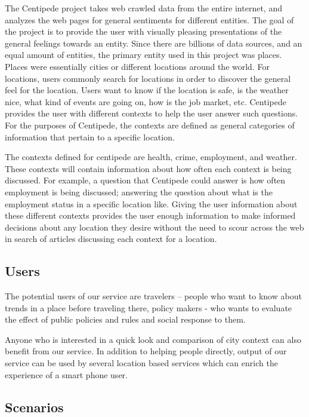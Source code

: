 \documentclass[conference]{IEEEtran}
\begin{document}
The Centipede project takes web crawled data from the entire internet, and analyzes the web pages for general sentiments for different entities. The goal of the project is to provide the user with visually pleasing presentations of the general feelings towards an entity. Since there are billions of data sources, and an equal amount of entities, the primary entity used in this project was places. Places were essentially cities or different locations around the world. For locations, users commonly search for locations in order to discover the general feel for the location. Users want to know if the location is safe, is the weather nice, what kind of events are going on, how is the job market, etc. Centipede provides the user with different contexts to help the user answer such questions. For the purposes of Centipede, the contexts are defined as general categories of information that pertain to a specific location. 

The contexts defined for centipede are health, crime, employment, and weather. These contexts will contain information about how often each context is being discussed. For example, a question that Centipede could answer is how often employment is being discussed; answering the question about what is the employment status in a specific location like. Giving the user information about these different contexts provides the user enough information to make informed decisions about any location they desire without the need to scour across the web in search of articles discussing each context for a location. 


\subsection{Users}
The potential users of our service are travelers – people who want to know about trends in a place before traveling there, policy makers - who wants to evaluate the effect of public policies and rules and social response to them.
 
Anyone who is interested in a quick look and comparison of city context can also benefit from our service. In addition to helping people directly, output of our service can be used by several location based services which can enrich the experience of a smart phone user.

\subsection{Scenarios}
\end{document}
